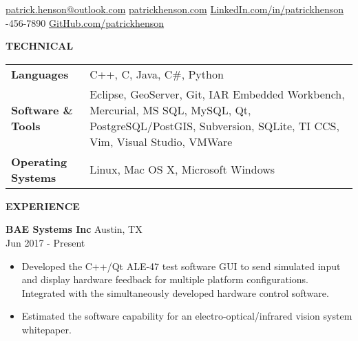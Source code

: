 \documentclass[10pt]{article}
\newcommand{\verticalspace}{\vspace{1.5mm}}
\newcommand{\horizontalrule}{\noindent\hrulefill}
\newcommand{\heading}{\noindent\Large\bf} %
\newcommand{\headingspace}{\vspace{3.5mm}}
\begin{document}
\renewcommand\familydefault{\sfdefault}



\hfill

\vspace{-2mm}
\horizontalrule

\noindent 
\href{mailto:fullname@email.com}{patrick.henson@outlook.com}
\hfill
\href{https://patrickhenson.com}{patrickhenson.com}
\hfill
\href{linkedin.com/in/patrickhenson}{LinkedIn.com/in/patrickhenson}
\\
-456-7890
\hfill
\href{https://github.com/PatrickHenson}{GitHub.com/patrickhenson}

\headingspace
{\heading TECHNICAL}

\verticalspace

\begin{tabular}{@{} p{.2\linewidth} p{.75\linewidth}}

{\bf Languages} & C++, C, Java, C\#, Python \\

{\bf Software \& Tools} & Eclipse, GeoServer, Git, IAR Embedded Workbench, Mercurial, MS SQL, MySQL, Qt, PostgreSQL/PostGIS, Subversion, SQLite, TI CCS, Vim, Visual Studio, VMWare \\

{\bf Operating Systems} & Linux, Mac OS X, Microsoft Windows

\end{tabular}

{\heading EXPERIENCE}

\verticalspace

{\bf BAE Systems Inc} \hfill Austin, TX \\
 \hfill Jun 2017 - Present
\begin{itemize}
\item Developed the C++/Qt ALE-47 test software GUI to send simulated input and display hardware feedback for multiple platform configurations.  Integrated with the simultaneously developed hardware control software.
\item Estimated the software capability for an electro-optical/infrared vision system whitepaper.
\end{itemize}
\end{document}
